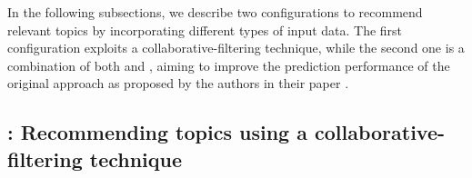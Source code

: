 
In the following subsections, we describe two \TF configurations %
to recommend relevant topics by incorporating different types of input 
data. The first configuration exploits a collaborative-filtering technique, while the second one is a 
combination of both \MNB and \TFa, aiming to improve the prediction performance 
of the original \MNB approach as proposed by the authors in their paper \cite{10.1145/3383219.3383227}. %







\subsection{\TFa: Recommending topics using a collaborative-filtering technique} \label{sec:CFRecommendation}


